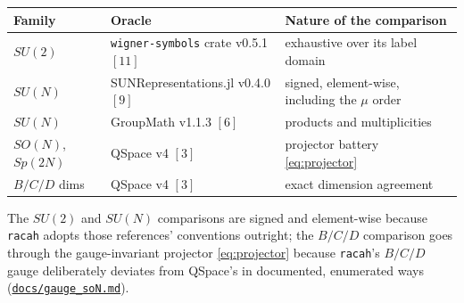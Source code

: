 \documentclass[11pt,a4paper]{article}
\theoremstyle{plain}
\theoremstyle{definition}
\newcommand{\code}[1]{\texttt{#1}}
\newcommand{\gaugeson}{\href{https://github.com/Ryo-wtnb11/racah/blob/main/docs/gauge_soN.md}{\code{docs/gauge\_soN.md}}}
\begin{document}
\begin{center}
\small
\begin{tabular}{@{}lll@{}}
\toprule
Family & Oracle & Nature of the comparison \\
\midrule
$SU(2)$ & \code{wigner-symbols} crate v0.5.1 $[11]$ & exhaustive over its label domain \\
$SU(N)$ & SUNRepresentations.jl v0.4.0 $[9]$ & signed, element-wise, including the $\mu$ order \\
$SU(N)$ & GroupMath v1.1.3 $[6]$ & products and multiplicities \\
$SO(N)$, $Sp(2N)$ & QSpace v4 $[3]$ & projector battery \eqref{eq:projector} \\
$B/C/D$ dims & QSpace v4 $[3]$ & exact dimension agreement \\
\bottomrule
\end{tabular}
\end{center}

The $SU(2)$ and $SU(N)$ comparisons are signed and element-wise because
\code{racah} adopts those references' conventions outright; the $B/C/D$
comparison goes through the gauge-invariant projector
\eqref{eq:projector} because \code{racah}'s $B/C/D$ gauge deliberately deviates
from QSpace's in documented, enumerated ways (\gaugeson{}).
\end{document}
